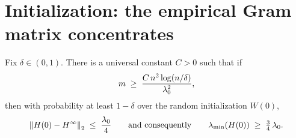 \section{Initialization: the empirical Gram matrix concentrates}\label{sec:init-gram}

\begin{lemma}\label{lem:init-gram-close}
Fix $\delta \in (0, 1)$. There is a universal constant $C > 0$ such that if
\begin{align}\label{eq:width-init}
m \;\ge\; \frac{C \, n^2 \log(n / \delta)}{\lambda_{0}^2},
\end{align}
then with probability at least $1 - \delta$ over the random initialization $W(0)$,
\begin{align}\label{eq:gram-close-init}
\left\| H(0) - H^{\infty} \right\|_{2} \;\le\; \frac{\lambda_{0}}{4}
\qquad\text{and consequently}\qquad
\lambda_{\min}\!\left( H(0) \right) \;\ge\; \tfrac{3}{4}\,\lambda_{0}.
\end{align}
\end{lemma}

